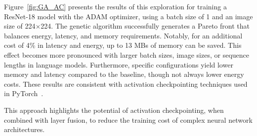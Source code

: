 \documentclass[lettersize,journal]{IEEEtran}
\begin{document}
Figure~\ref{fig:GA_AC} presents the results of this exploration for training a ResNet-18 model with the ADAM optimizer, using a batch size of 1 and an image size of 224$\times$224. The genetic algorithm successfully generates a Pareto front that balances energy, latency, and memory requirements. Notably, for an additional cost of 4\% in latency and energy, up to 13 MBs of memory can be saved. This effect becomes more pronounced with larger batch sizes, image sizes, or sequence lengths in language models. Furthermore, specific configurations yield lower memory and latency compared to the baseline, though not always lower energy costs. These results are consistent with activation checkpointing techniques used in PyTorch~\cite{pytorch_mincut_2022}.

This approach highlights the potential of activation checkpointing, when combined with layer fusion, to reduce the training cost of complex neural network architectures.



\end{document}
